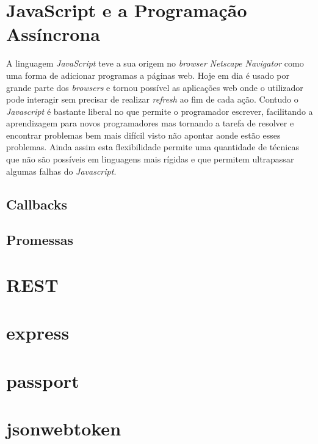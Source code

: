 \section{JavaScript e a Programação Assíncrona}
A linguagem \textit{JavaScript} teve a sua origem no \textit{browser} \textit{Netscape Navigator} como uma forma de adicionar programas a páginas web.\cite{elojs} Hoje em dia é usado por grande parte dos \textit{browsers} e tornou possível as aplicações web onde o utilizador pode interagir sem precisar de realizar \textit{refresh} ao fim de cada ação.
Contudo o \textit{Javascript} é bastante liberal no que permite o programador escrever, facilitando a aprendizagem para novos programadores mas tornando a tarefa de resolver e encontrar problemas bem mais difícil visto não apontar aonde estão esses problemas. Ainda assim esta flexibilidade permite uma quantidade de técnicas que não são possíveis em linguagens mais rígidas e que permitem ultrapassar algumas falhas do \textit{Javascript}.\cite{elojs} 
\cite{elojs}

\subsection{Callbacks}

\subsection{Promessas}

\section{REST}
\cite{restws}

\section{express}
\cite{wdmongo}

\section{passport}

\section{jsonwebtoken}

